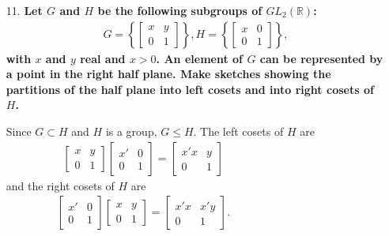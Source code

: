 \documentclass[a4paper,12pt]{article}
\begin{document}
\begin{enumerate}
    \item[11.]
        \boldmath
        \textbf{Let $G$ and $H$ be the following subgroups of $GL_2(\mathbb{R})$:
        \begin{align*}
            G = \left\{ \left[ \begin{array}{cc}
                    x & y \\
                    0 & 1
            \end{array} \right] \right\},
            H = \left\{ \left[ \begin{array}{cc}
                    x & 0 \\
                    0 & 1
            \end{array} \right] \right\},
        \end{align*}
        with $x$ and $y$ real and $x > 0$. An element of $G$ can be represented by a point in the right half plane. Make sketches showing the partitions of the half plane into left cosets and into right cosets of $H$.} \par
        \unboldmath
        Since $G \subset H$ and $H$ is a group, $G \leq H$. The left cosets of $H$ are
        \begin{align*}
            \left[ \begin{array}{cc}
                    x & y \\
                    0 & 1
            \end{array} \right]
            \left[ \begin{array}{cc}
                    x' & 0 \\
                    0 & 1
            \end{array} \right]
            = \left[ \begin{array}{cc}
                    x'x & y \\
                    0 & 1
            \end{array} \right]
            \hspace{4cm}
        \end{align*}
        and the right cosets of $H$ are
        \begin{align*}
            \left[ \begin{array}{cc}
                    x' & 0 \\
                    0 & 1
            \end{array} \right]
            \left[ \begin{array}{cc}
                    x & y \\
                    0 & 1
            \end{array} \right]
            = \left[ \begin{array}{cc}
                    x'x & x'y \\
                    0 & 1
            \end{array} \right].
            \hspace{4cm}
        \end{align*}
\end{enumerate}
\end{document}
